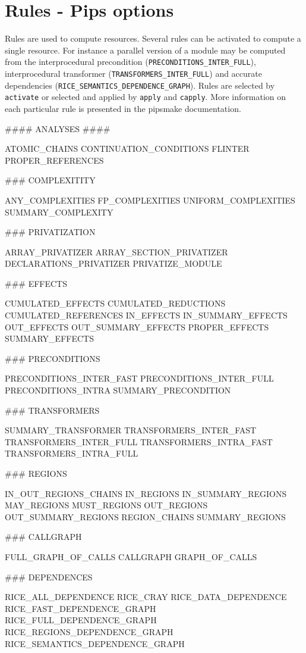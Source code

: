 \documentclass[a4paper,12pt]{article}
\begin{document}
\section{Rules - Pips options}
\label{rules}
Rules are used to compute resources. Several rules can be activated to
compute a single resource. For instance a parallel version of a module may
be computed from the interprocedural precondition
(\verb+PRECONDITIONS_INTER_FULL+), interprocedural transformer
(\verb+TRANSFORMERS_INTER_FULL+) and accurate
dependencies (\verb+RICE_SEMANTICS_DEPENDENCE_GRAPH+). Rules are selected
by \verb+activate+ or selected and applied by \verb+apply+ and \verb+capply+.
More information on each particular rule is presented  in the pipsmake documentation.
\begin{verbatim*}
#### ANALYSES ####

ATOMIC_CHAINS                    
CONTINUATION_CONDITIONS  
FLINTER  
PROPER_REFERENCES

### COMPLEXITITY 

ANY_COMPLEXITIES  
FP_COMPLEXITIES  
UNIFORM_COMPLEXITIES
SUMMARY_COMPLEXITY

### PRIVATIZATION

ARRAY_PRIVATIZER  
ARRAY_SECTION_PRIVATIZER  
DECLARATIONS_PRIVATIZER 
PRIVATIZE_MODULE

### EFFECTS

CUMULATED_EFFECTS  
CUMULATED_REDUCTIONS  
CUMULATED_REFERENCES  
IN_EFFECTS 
IN_SUMMARY_EFFECTS 
OUT_EFFECTS  
OUT_SUMMARY_EFFECTS  
PROPER_EFFECTS
SUMMARY_EFFECTS


### PRECONDITIONS

PRECONDITIONS_INTER_FAST  
PRECONDITIONS_INTER_FULL  
PRECONDITIONS_INTRA  
SUMMARY_PRECONDITION


### TRANSFORMERS

SUMMARY_TRANSFORMER
TRANSFORMERS_INTER_FAST
TRANSFORMERS_INTER_FULL
TRANSFORMERS_INTRA_FAST
TRANSFORMERS_INTRA_FULL


### REGIONS 

IN_OUT_REGIONS_CHAINS  
IN_REGIONS 
IN_SUMMARY_REGIONS 
MAY_REGIONS 
MUST_REGIONS
OUT_REGIONS  
OUT_SUMMARY_REGIONS  
REGION_CHAINS
SUMMARY_REGIONS

### CALLGRAPH 

FULL_GRAPH_OF_CALLS  
CALLGRAPH  
GRAPH_OF_CALLS 

### DEPENDENCES

RICE_ALL_DEPENDENCE
RICE_CRAY
RICE_DATA_DEPENDENCE
RICE_FAST_DEPENDENCE_GRAPH
RICE_FULL_DEPENDENCE_GRAPH
RICE_REGIONS_DEPENDENCE_GRAPH
RICE_SEMANTICS_DEPENDENCE_GRAPH


\end{verbatim*}
\end{document}
